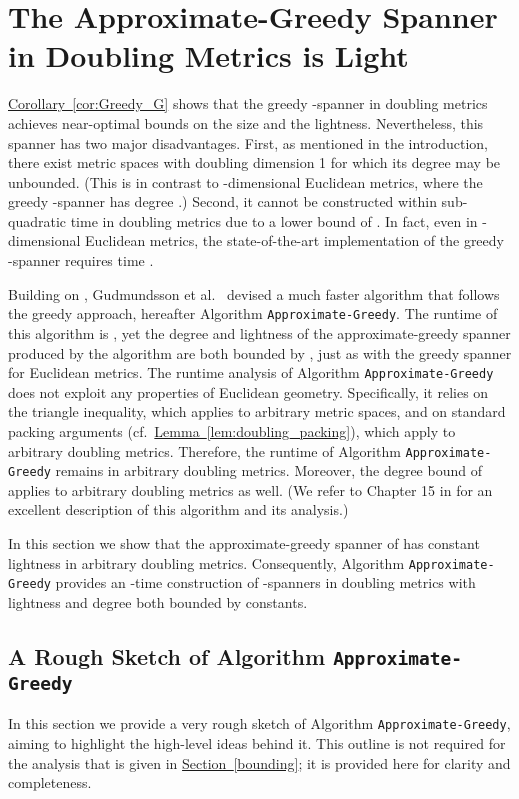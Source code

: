 \documentclass[11pt,letterpaper]{article}
\newcommand{\namedref}[2]{\hyperref[#2]{#1~\ref*{#2}}}
\newcommand{\sectionref}[1]{\namedref{Section}{#1}}
\newcommand{\lemmaref}[1]{\namedref{Lemma}{#1}}
\newcommand{\corollaryref}[1]{\namedref{Corollary}{#1}}
\begin{document}
\section{The Approximate-Greedy Spanner in Doubling Metrics is Light}\label{sec:Fast_alg}
\corollaryref{cor:Greedy_G} shows that the greedy -spanner in doubling metrics achieves near-optimal bounds on the size and the lightness.
Nevertheless, this spanner has two major disadvantages.
First, as mentioned in the introduction, there exist metric spaces with doubling dimension 1 for which its degree may be unbounded.
(This is in contrast to -dimensional Euclidean metrics, where the greedy -spanner has degree .)
Second, it cannot be constructed within sub-quadratic time in doubling metrics due to a lower bound of \cite{HM06}.
In fact, even in -dimensional Euclidean metrics, the state-of-the-art implementation of the greedy -spanner requires time  \cite{BCFMS10}.

\sloppy Building on \cite{DHN93,DN97}, Gudmundsson et al.\ \cite{GLN02} devised a much faster algorithm that follows the greedy approach,
hereafter Algorithm \texttt{Approximate-Greedy}.
The runtime of this algorithm is , yet the degree and lightness of the approximate-greedy spanner produced by the algorithm are both bounded by , just as with the greedy spanner for Euclidean metrics.
The runtime analysis of Algorithm \texttt{Approximate-Greedy} \cite{GLN02} does not exploit any properties of Euclidean geometry.
Specifically, it relies on the triangle inequality, which applies to arbitrary metric spaces, and on standard packing arguments (cf.\ \lemmaref{lem:doubling_packing}), which apply to arbitrary doubling metrics.
Therefore, the runtime of Algorithm \texttt{Approximate-Greedy} remains  in arbitrary doubling metrics.
Moreover, the degree bound of   applies to arbitrary doubling metrics as well.
(We refer to Chapter 15 in \cite{NS07} for an excellent description of this algorithm and its analysis.)

In this section we show that the approximate-greedy spanner of \cite{GLN02} has constant lightness in arbitrary doubling metrics.
Consequently, Algorithm  \texttt{Approximate-Greedy} provides an -time construction of -spanners in doubling metrics with lightness and degree both bounded by constants.

\subsection{A Rough Sketch of Algorithm \texttt{Approximate-Greedy}}
In this section we provide a  very rough sketch of Algorithm \texttt{Approximate-Greedy}, aiming to highlight the high-level ideas behind it.
This outline is not required for the analysis that is given in \sectionref{bounding}; it is provided here for clarity and completeness.
\end{document}
